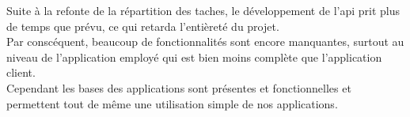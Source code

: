 \documentclass[../rapport.tex]{subfiles}
\begin{document}
Suite à la refonte de la répartition des taches, le développement de l'api prit plus de temps que prévu, ce qui retarda l'entièreté du projet.\\
Par conscéquent, beaucoup de fonctionnalités sont encore manquantes, surtout au niveau de l'application employé qui est bien moins complète que l'application client.\\
Cependant les bases des applications sont présentes et fonctionnelles et permettent tout de même une utilisation simple de nos applications. 

\newpage
\end{document}
